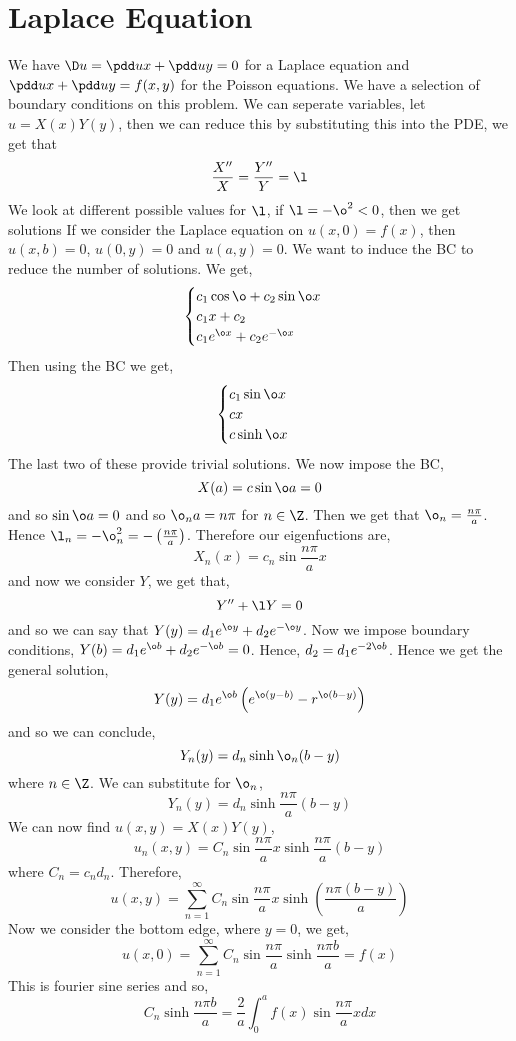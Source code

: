 
\section{Laplace Equation}
We have $\D u = \pdd u x + \pdd u y = 0$ for a Laplace equation and $\pdd u x + \pdd u y = f(x, y)$ for the Poisson equations. We have a selection of boundary conditions on this problem. We can seperate variables, let $u = X(x)Y(y)$, then we can reduce this by substituting this into the PDE, we get that
$$ \frac{X''}{X} = \frac{Y''}{Y} = \l $$
We look at different possible values for $\l$, if $\l = - \o^2 < 0$, then we get solutions
If we consider the Laplace equation on $u(x, 0) = f(x)$, then $u(x, b) = 0$, $u(0, y) = 0$ and $u(a, y) = 0$. We want to induce the BC to reduce the number of solutions. We get,
$$ \begin{cases}
  c_1\cos \o + c_2\sin \o x \\
  c_1x + c_2 \\
  c_1e^{\o x} + c_2e^{-\o x}
\end{cases} $$
Then using the BC we get,
$$ \begin{cases}
  c_1\sin \o x \\
  c x\\
  c\sinh \o x
\end{cases} $$
The last two of these provide trivial solutions. We now impose the BC,
$$ X(a) = c\sin \o a = 0 $$
and so $\sin \o a = 0$ and so $\o_n a = n\pi$ for $n \in \Z$. Then we get that $\o_n = \frac{n\pi}{a}$. Hence $\l_n = -\o_n^2 = -\left( \frac{n\pi}{a} \right)$. Therefore our eigenfuctions are,
$$ X_n(x) = c_n\sin \frac{n\pi}{a}x $$
and now we consider $Y$, we get that,
$$ Y'' + \l Y = 0 $$
and so we can say that $Y(y) = d_1e^{\o y} + d_2e^{-\o y}$. Now we impose boundary conditions, $Y(b) = d_1 e^{\o b} + d_2 e^{-\o b} = 0$. Hence, $d_2 = d_1e^{-2\o b}$. Hence we get the general solution,
$$ Y(y) = d_1 e^{\o b}\left( e^{\o (y - b)} - r^{\o(b - y)}\right) $$
and so we can conclude,
$$ Y_n(y) = d_n\sinh \o_n (b - y) $$
where $n \in \Z$. We can substitute for $\o_n$,
$$ Y_n(y) = d_n\sinh \frac{n\pi}{a}(b - y) $$
We can now find $u(x, y) = X(x)Y(y)$,
$$ u_n(x, y) = C_n \sin \frac{n\pi}{a}x\sinh \frac{n\pi}{a}(b - y) $$
where $C_n = c_nd_n$. Therefore,
$$ u(x, y) = \sum_{n=1}^\infty C_n\sin \frac{n\pi}{a}x\sinh \left( \frac{n\pi (b - y)}{a} \right) $$
Now we consider the bottom edge, where $y = 0$, we get,
$$ u(x, 0) = \sum_{n=1}^\infty C_n \sin \frac{n\pi }{a}\sinh \frac{n\pi b}{a} = f(x)$$
This is fourier sine series and so,
$$ C_n\sinh \frac{n\pi b}{a} = \frac{2}{a}\int_0^a f(x)\sin \frac{n\pi}{a}xdx $$

